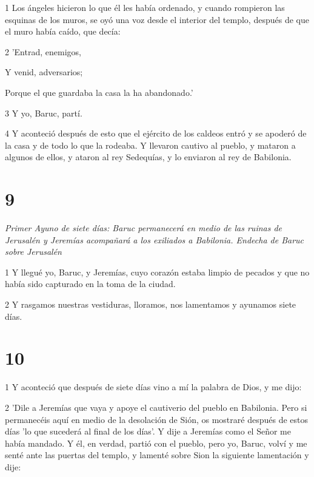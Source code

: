 \par 1 Los ángeles hicieron lo que él les había ordenado, y cuando rompieron las esquinas de los muros, se oyó una voz desde el interior del templo, después de que el muro había caído, que decía:

\par 2 'Entrad, enemigos,

\par Y venid, adversarios;

\par Porque el que guardaba la casa la ha abandonado.'

\par 3 Y yo, Baruc, partí.

\par 4 Y aconteció después de esto que el ejército de los caldeos entró y se apoderó de la casa y de todo lo que la rodeaba. Y llevaron cautivo al pueblo, y mataron a algunos de ellos, y ataron al rey Sedequías, y lo enviaron al rey de Babilonia.

\chapter{9}

\par \textit{Primer Ayuno de siete días: Baruc permanecerá en medio de las ruinas de Jerusalén y Jeremías acompañará a los exiliados a Babilonia. Endecha de Baruc sobre Jerusalén}

\par 1 Y llegué yo, Baruc, y Jeremías, cuyo corazón estaba limpio de pecados y que no había sido capturado en la toma de la ciudad.

\par 2 Y rasgamos nuestras vestiduras, lloramos, nos lamentamos y ayunamos siete días.

\chapter{10}

\par 1 Y aconteció que después de siete días vino a mí la palabra de Dios, y me dijo:

\par 2 'Dile a Jeremías que vaya y apoye el cautiverio del pueblo en Babilonia. Pero si permanecéis aquí en medio de la desolación de Sión, os mostraré después de estos días 'lo que sucederá al final de los días'. Y dije a Jeremías como el Señor me había mandado. Y él, en verdad, partió con el pueblo, pero yo, Baruc, volví y me senté ante las puertas del templo, y lamenté sobre Sion la siguiente lamentación y dije:

